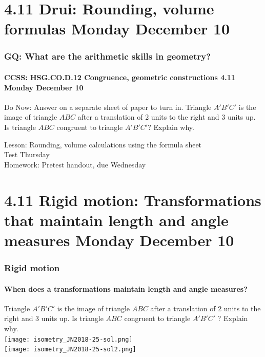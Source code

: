 \documentclass{beamer}
\begin{document}
  \section{4.11 Drui: Rounding, volume formulas Monday December 10}
    \frame
    {
      \frametitle{GQ: What are the arithmetic skills in geometry?}
      \framesubtitle{CCSS: HSG.CO.D.12 Congruence, geometric constructions  \alert{4.11 Monday December 10}}

      \begin{block}{Do Now: Answer on a separate sheet of paper to turn in.}
        Triangle $A'B'C'$ is the image of triangle $ABC$ after a translation of 2 units to the right and 3 units up. Is triangle $ABC$ congruent to triangle $A'B'C'$? Explain why.
      \end{block} \vspace{0.5cm}
      Lesson: Rounding, volume calculations using the formula sheet\\[0.5cm]
      \alert{Test Thursday} \\[0.5cm]
      Homework: Pretest handout, due Wednesday
    }

  \section{4.11 Rigid motion: Transformations that maintain length and angle measures Monday December 10}
    \frame
    {
      \frametitle{Rigid motion}
      \framesubtitle{When does a transformations maintain length and angle measures?}

      Triangle $A'B'C'$ is the image of triangle $ABC$ after a translation of 2 units to the right and 3 units up. Is triangle $ABC$ congruent to triangle $A'B'C'$ ? Explain why.\\[0.25cm]

      \pause \texttt{[image: isometry\_JN2018-25-sol.png]}\\
      \pause \texttt{[image: isometry\_JN2018-25-sol2.png]}
    }
\end{document}
